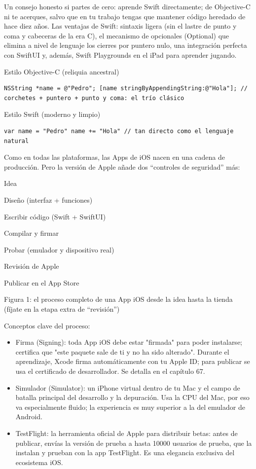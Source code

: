 Un consejo honesto si partes de cero: aprende Swift directamente; de Objective-C ni te acerques, salvo que en tu trabajo tengas que mantener código heredado de hace diez años. Las ventajas de Swift: sintaxis ligera (sin el lastre de punto y coma y cabeceras de la era C), el mecanismo de opcionales (Optional) que elimina a nivel de lenguaje los cierres por puntero nulo, una integración perfecta con SwiftUI y, además, Swift Playgrounds en el iPad para aprender jugando.

Estilo Objective-C (reliquia ancestral)

\begin{lstlisting}
NSString *name = @"Pedro"; [name stringByAppendingString:@"Hola"]; // corchetes + puntero + punto y coma: el trío clásico
\end{lstlisting}

Estilo Swift (moderno y limpio)

\begin{lstlisting}
var name = "Pedro" name += "Hola" // tan directo como el lenguaje natural
\end{lstlisting}


Como en todas las plataformas, las Apps de iOS nacen en una cadena de producción. Pero la versión de Apple añade dos “controles de seguridad” más:

Idea

Diseño (interfaz + funciones)

Escribir código (Swift + SwiftUI)

Compilar y firmar

Probar (emulador y dispositivo real)

Revisión de Apple

Publicar en el App Store

\begin{center}\small\color{gray}Figura 1: el proceso completo de una App iOS desde la idea hasta la tienda (fíjate en la etapa extra de “revisión”)\end{center}

Conceptos clave del proceso:

\begin{itemize}
  \item Firma (Signing): toda App iOS debe estar "firmada" para poder instalarse; certifica que "este paquete sale de ti y no ha sido alterado". Durante el aprendizaje, Xcode firma automáticamente con tu Apple ID; para publicar se usa el certificado de desarrollador. Se detalla en el capítulo 67.
  \item Simulador (Simulator): un iPhone virtual dentro de tu Mac y el campo de batalla principal del desarrollo y la depuración. Usa la CPU del Mac, por eso va especialmente fluido; la experiencia es muy superior a la del emulador de Android.
  \item TestFlight: la herramienta oficial de Apple para distribuir betas: antes de publicar, envías la versión de prueba a hasta 10000 usuarios de prueba, que la instalan y prueban con la app TestFlight. Es una elegancia exclusiva del ecosistema iOS.
\end{itemize}

